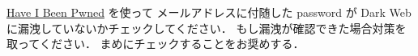 \begin{Q}
   \href{https://haveibeenpwned.com/}{Have I Been Pwned}
   を使って
   メールアドレスに付随した
   password が Dark Web に漏洩していないかチェックしてください．
   もし漏洩が確認できた場合対策を取ってください．
   まめにチェックすることをお奨めする．
\end{Q}

%
%
%
%
%    
%
% 
%
%  
%
%      
%    
%
%
